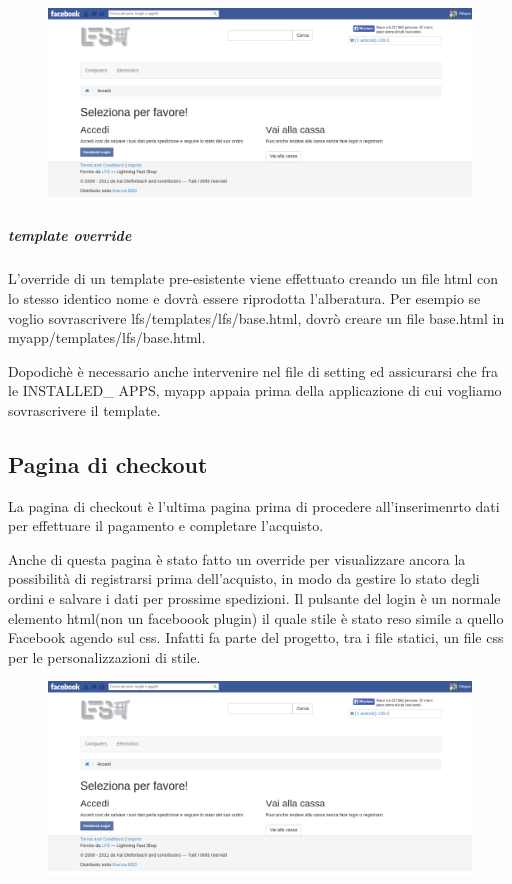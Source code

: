 \begin{figure}
\includegraphics[width=0.9\columnwidth]{img/checkout}
\end{figure}

\subparagraph{template override}
L'override di un template pre-esistente viene effettuato creando un file html con lo stesso identico nome e dovrà essere riprodotta l'alberatura. Per esempio se voglio sovrascrivere lfs/templates/lfs/base.html, dovrò creare un file base.html in myapp/templates/lfs/base.html. 

Dopodichè è necessario anche intervenire nel file di setting ed assicurarsi che fra le INSTALLED\_ APPS, myapp appaia prima della applicazione di cui vogliamo sovrascrivere il template.

\subsection{Pagina di checkout}
La pagina di checkout è l'ultima pagina prima di procedere all'inserimenrto dati per effettuare il pagamento e completare l'acquisto.

Anche di questa pagina è stato fatto un override per visualizzare ancora la possibilità di registrarsi prima dell'acquisto, in modo da gestire lo stato degli ordini e salvare i dati per prossime spedizioni. Il pulsante del login è un normale elemento html(non un faceboook plugin) il quale stile è stato reso simile a quello Facebook agendo sul css. Infatti fa parte del progetto, tra i file statici, un file css per le personalizzazioni di stile.

\begin{figure}
\includegraphics[width=0.9\columnwidth]{img/checkout}
\end{figure}

